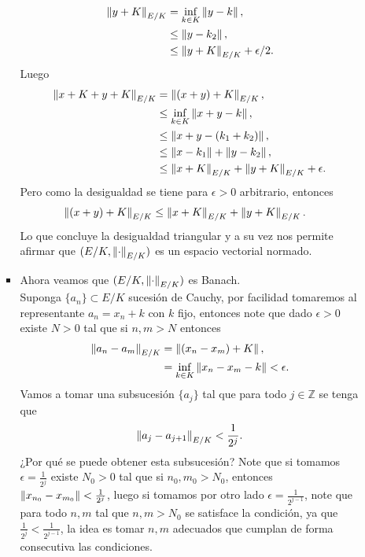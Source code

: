 \begin{homeworkProblem}
\begin{solution}
\begin{enumerate}[(i)]
\begin{enumerate}[(a)]
\begin{itemize}
\begin{align*}
                \left\|y+K\right\|_{E/K}&=\inf_{k\in K}\left\|y-k\right\|,\\
                &\leq \left\|y-k_2\right\|,\\
                &\leq \left\|y+K\right\|_{E/K}+\epsilon/2.
              \end{align*}
              Luego
              \begin{align*}
                \left\|x+K+y+K\right\|_{E/K}&=\left\|(x+y)+K\right\|_{E/K},\\
                &\leq \inf_{k\in K}\left\|x+y-k\right\|,\\
                &\leq \left\|x+y-(k_1+k_2)\right\|,\\
                &\leq \left\|x-k_1\right\|+\left\|y-k_2\right\|,\\
                &\leq \left\|x+K\right\|_{E/K}+\left\|y+K\right\|_{E/K}+\epsilon.
              \end{align*}
              Pero como la desigualdad se tiene para $\epsilon>0$ arbitrario, entonces
              \begin{align*}
                \left\|(x+y)+K\right\|_{E/K}&\leq \left\|x+K\right\|_{E/K}+\left\|y+K\right\|_{E/K}.
              \end{align*}
              Lo que concluye la desigualdad triangular y a su vez nos permite afirmar que $(E/K,\left\|\cdot\right\|_{E/K})$ es un espacio vectorial normado.
            \item Ahora veamos que $(E/K,\left\|\cdot\right\|_{E/K})$ es Banach.\\
              Suponga $\{a_{n}\}\subset E/K$ sucesión de Cauchy, por facilidad tomaremos al representante $a_{n}=x_{n}+k$ con $k$ fijo, entonces note que dado $\epsilon > 0$ existe $N>0$ tal que si $n,m>N$ entonces
                \begin{align*}
                  \left\|a_{n}-a_{m}\right\|_{E/K}&=\left\|(x_n-x_m)+K\right\|,\\
                  &=\inf_{k\in K}\left\|x_n-x_m-k\right\|<\epsilon.
                \end{align*}
                Vamos a tomar una subsucesión $\{a_{j}\}$ tal que para todo $j\in \mathbb{Z}$ se tenga que
                \begin{align*}
                  \left\|a_{j}-a_{j+1}\right\|_{E/K}<\frac{1}{2^{j}}.
                \end{align*}
                ¿Por qué se puede obtener esta subsucesión? Note que si tomamos $\epsilon=\frac{1}{2^{j}}$ existe $N_0>0$ tal que si $n_0,m_0>N_0$, entonces $\left\|x_{n_0}-x_{m_0}\right\|<\frac{1}{2^{j}}$, luego si tomamos por otro lado $\epsilon=\frac{1}{2^{j-1}}$, note que para todo $n,m$ tal que $n,m>N_0$ se satisface la condición, ya que $\frac{1}{2^{j}}<\frac{1}{2^{j-1}}$, la idea es tomar $n,m$ adecuados que cumplan de forma consecutiva las condiciones.\\

\end{itemize}
\end{enumerate}
\end{enumerate}
\end{solution}
\end{homeworkProblem}
